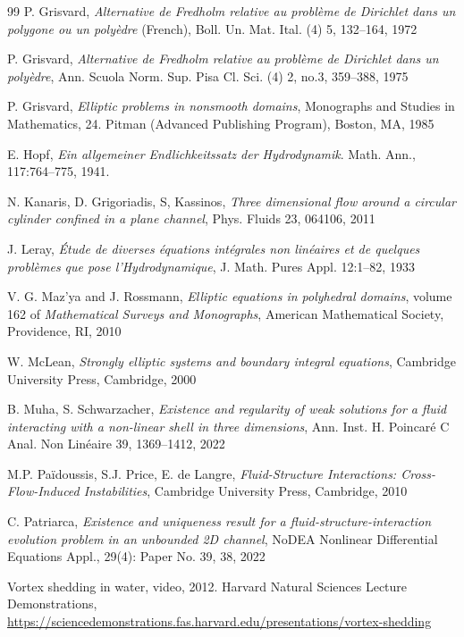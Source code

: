 \documentclass[11pt,a4paper]{amsart}
\theoremstyle{remark}
\theoremstyle{definition}
\numberwithin{equation}{section}
\numberwithin{proposition}{section}
\begin{document}
{\begin{thebibliography}{99}
 P. Grisvard, {\em Alternative de Fredholm relative au problème de Dirichlet dans un polygone ou un polyèdre} (French), Boll. Un. Mat. Ital. (4) 5, 132--164, 1972

 P. Grisvard, {\em Alternative de Fredholm relative au problème de Dirichlet dans un polyèdre}, Ann. Scuola Norm. Sup. Pisa Cl. Sci. (4) 2, no.3, 359--388, 1975

 P. Grisvard, {\em Elliptic problems in nonsmooth domains}, Monographs and Studies in Mathematics, 24. Pitman (Advanced Publishing Program), Boston, MA, 1985

E. Hopf,
\newblock \textit{Ein allgemeiner Endlichkeitssatz der Hydrodynamik}.
\newblock Math. Ann., 117:764--775, 1941.

N. Kanaris, D. Grigoriadis, S, Kassinos, \textit{Three dimensional flow around a circular cylinder confined in a plane channel}, Phys. Fluids 23, 064106, 2011

 J. Leray, {\em {\'E}tude de diverses {\'e}quations int{\'e}grales non lin{\'e}aires et de quelques probl{\`e}mes que pose l'Hydrodynamique}, J. Math. Pures Appl. 12:1--82, 1933

V. G. Maz'ya and J. Rossmann,
\newblock \textit{Elliptic equations in polyhedral domains}, volume 162 of \textit{Mathematical Surveys and Monographs},
\newblock American Mathematical Society, Providence, RI, 2010

W. McLean,
\newblock \textit{Strongly elliptic systems and boundary integral equations},
\newblock Cambridge University Press, Cambridge, 2000

B. Muha, S. Schwarzacher, {\em
Existence and regularity of weak solutions for a fluid interacting with a non-linear shell in three dimensions}, Ann. Inst. H. Poincaré C Anal. Non Linéaire 39, 1369–1412, 2022

 M.P. Païdoussis, S.J. Price, E. de Langre, {\em Fluid-Structure Interactions: Cross-Flow-Induced Instabilities},
Cambridge University Press, Cambridge, 2010

C. Patriarca, \textit{Existence and uniqueness result for a fluid-structure-interaction evolution problem in an unbounded 2D channel}, NoDEA Nonlinear Differential Equations Appl., 29(4): Paper No. 39, 38, 2022

 Vortex shedding in water, video, 2012.
\newblock Harvard Natural Sciences Lecture Demonstrations,\\
\url{https://sciencedemonstrations.fas.harvard.edu/presentations/vortex-shedding}
\end{thebibliography}
}
\end{document}
